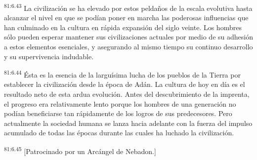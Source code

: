 \par
\textsuperscript{81:6.43} La civilización se ha elevado por estos peldaños de la escala evolutiva hasta alcanzar el nivel en que se podían poner en marcha las poderosas influencias que han culminado en la cultura en rápida expansión del siglo veinte. Los hombres sólo pueden esperar mantener sus civilizaciones actuales por medio de su adhesión a estos elementos esenciales, y asegurando al mismo tiempo su continuo desarrollo y su supervivencia indudable.

\par
\textsuperscript{81:6.44} Ésta es la esencia de la larguísima lucha de los pueblos de la Tierra por establecer la civilización desde la época de Adán. La cultura de hoy en día es el resultado neto de esta ardua evolución. Antes del descubrimiento de la imprenta, el progreso era relativamente lento porque los hombres de una generación no podían beneficiarse tan rápidamente de los logros de sus predecesores. Pero actualmente la sociedad humana se lanza hacia adelante con la fuerza del impulso acumulado de todas las épocas durante las cuales ha luchado la civilización.

\par
\textsuperscript{81:6.45} [Patrocinado por un Arcángel de Nebadon.]